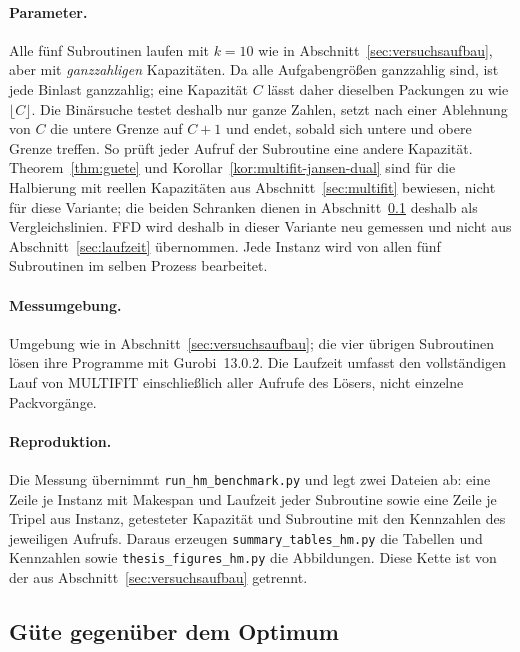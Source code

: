 \paragraph{Parameter.}
Alle fünf Subroutinen laufen mit $k = 10$ wie in Abschnitt~\ref{sec:versuchsaufbau}, aber mit
\emph{ganzzahligen} Kapazitäten.
Da alle Aufgabengrößen ganzzahlig sind, ist jede Binlast ganzzahlig; eine Kapazität $C$ lässt
daher dieselben Packungen zu wie $\lfloor C \rfloor$.
Die Binärsuche testet deshalb nur ganze Zahlen, setzt nach einer Ablehnung von $C$ die untere
Grenze auf $C+1$ und endet, sobald sich untere und obere Grenze treffen.
So prüft jeder Aufruf der Subroutine eine andere Kapazität.
Theorem~\ref{thm:guete} und Korollar~\ref{kor:multifit-jansen-dual} sind für die Halbierung mit
reellen Kapazitäten aus Abschnitt~\ref{sec:multifit} bewiesen, nicht für diese Variante; die
beiden Schranken dienen in Abschnitt~\ref{sub:hm-guete} deshalb als Vergleichslinien.
FFD wird deshalb in dieser Variante neu gemessen und nicht aus Abschnitt~\ref{sec:laufzeit}
übernommen.
Jede Instanz wird von allen fünf Subroutinen im selben Prozess bearbeitet.

\paragraph{Messumgebung.}
Umgebung wie in Abschnitt~\ref{sec:versuchsaufbau}; die vier übrigen Subroutinen lösen ihre
Programme mit Gurobi~13.0.2.
Die Laufzeit umfasst den vollständigen Lauf von MULTIFIT einschließlich aller Aufrufe des
Lösers, nicht einzelne Packvorgänge.

\paragraph{Reproduktion.}
Die Messung übernimmt \texttt{run\_hm\_benchmark.py} und legt zwei Dateien ab: eine Zeile je
Instanz mit Makespan und Laufzeit jeder Subroutine sowie eine Zeile je Tripel aus Instanz,
getesteter Kapazität und Subroutine mit den Kennzahlen des jeweiligen Aufrufs.
Daraus erzeugen \texttt{summary\_tables\_hm.py} die Tabellen und Kennzahlen sowie
\texttt{thesis\_figures\_hm.py} die Abbildungen.
Diese Kette ist von der aus Abschnitt~\ref{sec:versuchsaufbau} getrennt.

\subsection{Güte gegenüber dem Optimum}
\label{sub:hm-guete}

